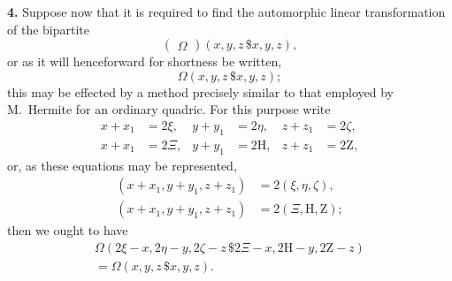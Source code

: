 \documentclass[11pt,a4paper]{book}
\begin{document}
\begin{center}
\newpage

\medskip
\noindent\textbf{4.} Suppose now that it is required to find the automorphic linear transformation of the bipartite
\[
\begin{pmatrix} \Omega \end{pmatrix}(x,y,z\,\$x,y,z),
\]
or as it will henceforward for shortness be written,
\[\Omega(x,y,z\,\$x,y,z);\]
this may be effected by a method precisely similar to that employed by M.~Hermite for an ordinary quadric. For this purpose write
\begin{align*}
x+x_1 &= 2\xi, & y+y_1 &= 2\eta, & z+z_1 &= 2\zeta, \\
x+x_1 &= 2\Xi, & y+y_1 &= 2\mathrm{H}, & z+z_1 &= 2\mathrm{Z},
\end{align*}
or, as these equations may be represented,
\begin{align*}
(x+x_1, y+y_1, z+z_1) &= 2(\xi, \eta, \zeta), \\
(x+x_1, y+y_1, z+z_1) &= 2(\Xi, \mathrm{H}, \mathrm{Z});
\end{align*}
then we ought to have
\begin{multline*}
\Omega(2\xi-x, 2\eta-y, 2\zeta-z\,\$2\Xi-x, 2\mathrm{H}-y, 2\mathrm{Z}-z) \\
= \Omega(x,y,z\,\$x,y,z).
\end{multline*}


\end{center}
\end{document}
